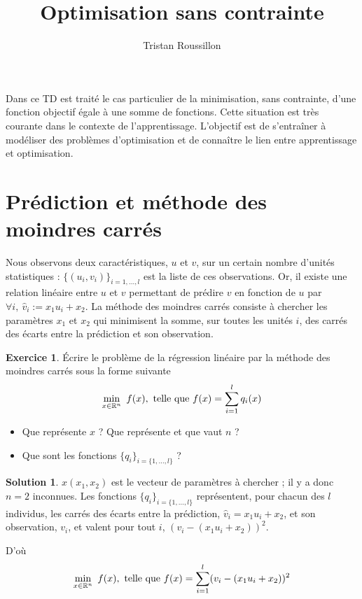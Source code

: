 \documentclass[a4paper,francais]{article}
\title{Optimisation sans contrainte}
\author{Tristan Roussillon}
\newcommand{\R}{{\ensuremath\mathbb{R}}}
\theoremstyle{definition}
\newtheorem{exercice}{Exercice}[section]
\newtheorem*{solution}{Solution}
\begin{document}
\maketitle

Dans ce TD est traité le cas particulier de la minimisation, sans contrainte,
d'une fonction objectif égale à une somme de fonctions. Cette situation est
très courante dans le contexte de l'apprentissage. L'objectif est de s'entraîner
à modéliser des problèmes d'optimisation et de connaître le lien entre apprentissage
et optimisation. 

\section{Prédiction et méthode des moindres carrés}
\label{sec:mc}

Nous observons deux caractéristiques, $u$ et $v$, sur un certain nombre d'unités
statistiques : $\{(u_i,v_i)\}_{i = 1,\dots, l}$ est la liste de ces observations.
Or, il existe une relation linéaire entre $u$ et $v$ permettant
de prédire $v$ en fonction de $u$ par $\forall i, \ \hat{v}_i := x_1u_i + x_2$.
La méthode des moindres carrés consiste à chercher les paramètres $x_1$ et $x_2$
qui minimisent la somme, sur toutes les unités $i$, des carrés des écarts entre la
prédiction et son observation. 

\begin{exercice}
  \'Ecrire le problème de la régression linéaire par la méthode des moindres carrés
  sous la forme suivante
  \[
  \min_{x \in \R^n} \ f(x), \ \text{telle que} \
  f(x) = \sum_{i = 1}^l q_i(x) 
  \]

  \begin{itemize}
  \item Que représente $x$ ? Que représente et que vaut $n$ ?
  \item Que sont les fonctions $\{q_i\}_{i = \{1,\dots,l\}}$ ?
  \end{itemize}
\end{exercice}

\begin{solution}
  $x(x_1,x_2)$ est le vecteur de paramètres à chercher ; il y a donc $n=2$ inconnues.
  Les fonctions $\{q_i\}_{i = \{1,\dots,l\}}$ représentent, pour chacun des $l$ individus, les carrés des
  écarts entre la prédiction, $\hat{v}_i = x_1u_i + x_2$, et son observation, $v_i$, et valent pour tout $i$,
  $(v_i - (x_1u_i + x_2))^2$.

  D'où
  \[
  \min_{x \in \R^n} \ f(x), \ \text{telle que} \
  f(x) = \sum_{i = 1}^l (v_i - (x_1u_i + x_2))^2 
  \]
\end{solution}
\end{document}
